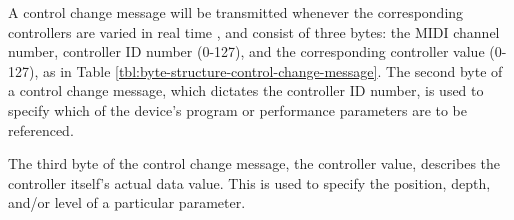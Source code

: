 A control change message will be transmitted whenever the corresponding controllers are varied in real time \cite{Huber_2012}, and consist of three bytes: the MIDI channel number, controller ID number (0-127), and the corresponding controller value (0-127), as in Table \ref{tbl:byte-structure-control-change-message}. The second byte of a control change message, which dictates the controller ID number, is used to specify which of the device's program or performance parameters are to be referenced. 

The third byte of the control change message, the controller value, describes the controller itself's actual data value. This is used to specify the position, depth, and/or level of a particular parameter\cite{Huber_2012}.